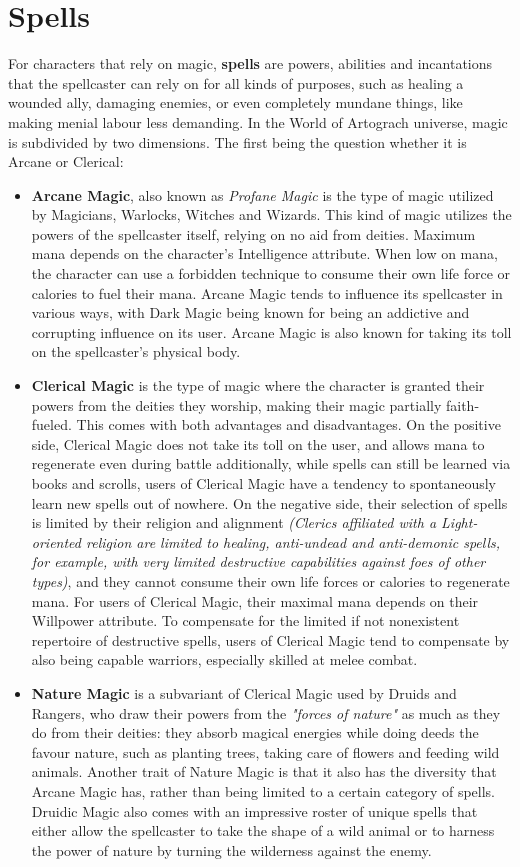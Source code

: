 \documentclass[openany,11pt,a4paper]{book}
\begin{document}
\section{Spells}
For characters that rely on magic, \textbf{spells} are powers, abilities and incantations that the spellcaster can rely on for all kinds of purposes, such as healing a wounded ally, damaging enemies, or even completely mundane things, like making menial labour less demanding. In the World of Artograch universe, magic is subdivided by two dimensions. The first being the question whether it is Arcane or Clerical:
\begin{itemize}
\item \textbf{Arcane Magic}, also known as \textit{Profane Magic} is the type of magic utilized by Magicians, Warlocks, Witches and Wizards. This kind of magic utilizes the powers of the spellcaster itself, relying on no aid from deities. Maximum mana depends on the character's Intelligence attribute. When low on mana, the character can use a forbidden technique to consume their own life force or calories to fuel their mana. Arcane Magic tends to influence its spellcaster in various ways, with Dark Magic being known for being an addictive and corrupting influence on its user. Arcane Magic is also known for taking its toll on the spellcaster's physical body.
\item \textbf{Clerical Magic} is the type of magic where the character is granted their powers from the deities they worship, making their magic partially faith-fueled. This comes with both advantages and disadvantages. On the positive side, Clerical Magic does not take its toll on the user, and allows mana to regenerate even during battle \textemdash additionally, while spells can still be learned via books and scrolls, users of Clerical Magic have a tendency to spontaneously learn new spells out of nowhere. On the negative side, their selection of spells is limited by their religion and alignment \textit{(Clerics affiliated with a Light-oriented religion are limited to healing, anti-undead and anti-demonic spells, for example, with very limited destructive capabilities against foes of other types)}, and they cannot consume their own life forces or calories to regenerate mana. For users of Clerical Magic, their maximal mana depends on their Willpower attribute. To compensate for the limited \textemdash if not nonexistent \textemdash repertoire of destructive spells, users of Clerical Magic tend to compensate by also being capable warriors, especially skilled at melee combat. 
\item \textbf{Nature Magic} is a subvariant of Clerical Magic used by Druids and Rangers, who draw their powers from the \textit{"forces of nature"} as much as they do from their deities: they absorb magical energies while doing deeds the favour nature, such as planting trees, taking care of flowers and feeding wild animals. Another trait of Nature Magic is that it also has the diversity that Arcane Magic has, rather than being limited to a certain category of spells. Druidic Magic also comes with an impressive roster of unique spells that either allow the spellcaster to take the shape of a wild animal or to harness the power of nature by turning the wilderness against the enemy.
\end{itemize}
\end{document}
